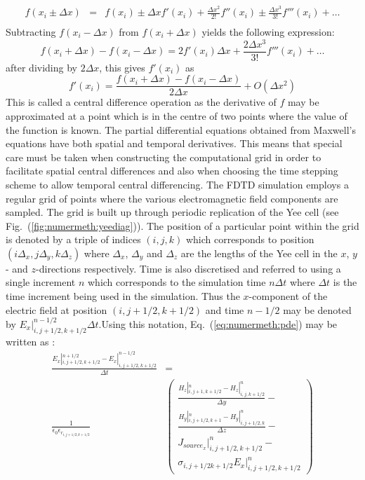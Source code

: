\documentclass[a4paper, 12pt]{article}
\newcommand{\eq}[1]{Eq.\ (\ref{#1})}
\newcommand{\rfig}[1]{Fig.\ (\ref{#1})}
\begin{document}
	\begin{eqnarray}
		f(x_i\pm\Delta x)&=&f(x_i)\pm\Delta xf'(x_i)+\frac{\Delta x^2}{2!}f''(x_i)
		\pm \frac{\Delta x^3}{3!}f'''(x_i) + \ldots\label{eq:numermeth:fxplus}\\
		\label{eq:numermeth:fxminus}
	\end{eqnarray}
	Subtracting $f(x_i-\Delta x)$ from $f(x_i+\Delta x)$ yields the following expression:
	\begin{equation}
		f(x_i+\Delta x)-f(x_i-\Delta x) = 2f'(x_i)\Delta x
		+\frac{2\Delta x^3}{3!}f'''(x_i) + \ldots
		\label{eq:numermeth:centdiff1}
	\end{equation}
	after dividing by $2\Delta x$, this gives $f'(x_i)$ as
	\begin{equation}
		f'(x_i)=\frac{f(x_i+\Delta x) - f(x_i-\Delta x)}{2\Delta x}+O(\Delta x^2)
		\label{eq:numermeth:centdiff}
	\end{equation}
	This is called a central difference operation as the derivative of $f$
	may be approximated at a point which is in the centre of two
	points where the value of the function is known. The partial differential equations obtained from Maxwell's equations
	have both spatial and temporal derivatives. This means that special
	care must be taken when constructing the computational grid in order
	to facilitate spatial central differences and also when choosing the
	time stepping scheme to allow temporal central differencing. The FDTD simulation employs a regular grid of
	points where the various electromagnetic field components are
	sampled. The grid is built up through periodic replication of the
	Yee cell (see \rfig{fig:numermeth:yeediag}). The position of a
	particular point within
	the grid is denoted by a triple of indices $(i,j,k)$ which corresponds
	to position $(i\Delta_x,j\Delta_y,k\Delta_z)$ where $\Delta_x$,
	$\Delta_y$ and $\Delta_z$ are the lengths of the Yee cell in the $x$,
	$y$- and $z$-directions respectively. Time is also discretised and
	referred to using a single increment $n$ which corresponds to the
	simulation time $n\Delta t$ where $\Delta t$ is the time increment
	being used in the simulation. Thus the $x$-component of the electric
	field at position $(i,j+1/2,k+1/2)$ and time $n-1/2$ may be denoted by
	$E_x|^{n-1/2}_{i,j+1/2,k+1/2}{\Delta t}$.Using this notation, \eq{eq:numermeth:pde} may be
	written as \cite{taflove00book}:
	\begin{align}
		\frac{E_x|^{n+1/2}_{i,j+1/2,k+1/2}-E_x|^{n-1/2}_{i,j+1/2,k+1/2}}{\Delta
			t}&=\nonumber\\
		\frac{1}{\epsilon_0\epsilon_{r_{i,j+1/2,k+1/2}}}&\left(\begin{array}{c}\frac{H_z|^n_{i,j+1,k+1/2}-H_z|^n_{i,j,k+1/2}}{\Delta
				y}-\\ \frac{H_y|^n_{i,j+1/2,k+1}- H_y|^n_{i,j+1/2,k}}{\Delta z}-\\ {J_{source_x}}|^n_{i,j+1/2,k+1/2}-\\\sigma_{i,j+1/2k+1/2}E_x|^n_{i,j+1/2,k+1/2}\end{array}\right)
		\label{eq:numermeth:difference1}
	\end{align}
\end{document}
